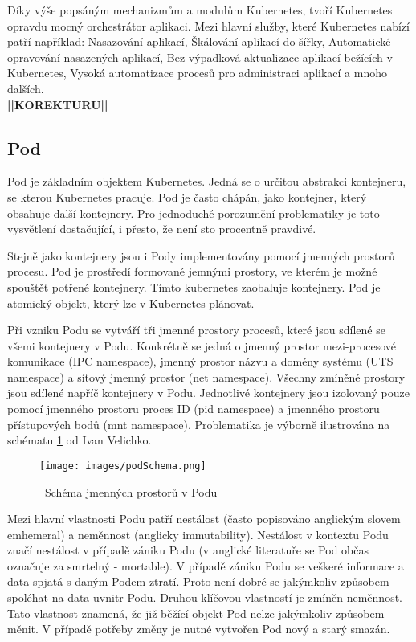 Díky výše popsáným mechanizmům a modulům Kubernetes, tvoří Kubernetes opravdu mocný orchestrátor aplikaci. Mezi hlavní služby, které Kubernetes nabízí patří například: Nasazování aplikací, Škálování aplikací do šířky, Automatické opravování nasazených aplikací, Bez výpadková aktualizace aplikací bežících v Kubernetes, Vysoká automatizace procesů pro administraci aplikací a mnoho dalších.\cite{poulton_2022_the}\\
\textbf{||KOREKTURU||}
\subsection{Pod}
Pod je základním objektem Kubernetes. Jedná se o určitou abstrakci kontejneru, se kterou Kubernetes pracuje. Pod je často chápán, jako kontejner, který obsahuje další kontejnery. Pro jednoduché porozumění problematiky je toto vysvětlení dostačující, i přesto, že není sto procentně pravdivé.

Stejně jako kontejnery jsou i Pody implementovány pomocí jmenných prostorů procesu. Pod je prostředí formované jemnými prostory, ve kterém je možné spouštět potřené kontejnery. Tímto kubernetes zaobaluje kontejnery. Pod je atomický objekt, který lze v Kubernetes plánovat.

Při vzniku Podu se vytváří tři jmenné prostory procesů, které jsou sdílené se všemi kontejnery v Podu. Konkrétně se jedná o jmenný prostor mezi-procesové komunikace (IPC namespace), jmenný prostor názvu a domény systému (UTS namespace) a síťový jmenný prostor (net namespace). Všechny zmíněné prostory jsou sdílené napříč kontejnery v Podu. Jednotlivé kontejnery jsou izolovaný pouze pomocí jmenného prostoru proces ID (pid namespace)
a jmenného prostoru přístupových bodů (mnt namespace). Problematika je výborně ilustrována na schématu \ref{img:podSchema} od Ivan Velichko.
\begin{figure}[ht]
\centering
\texttt{[image: images/podSchema.png]}
\caption{~Schéma jmenných prostorů v Podu\cite{velichko_2021_kubernetes}}\label{img:podSchema}
\end{figure}

Mezi hlavní vlastnosti Podu patří nestálost (často popisováno anglickým slovem emhemeral) a neměnnost (anglicky immutability). Nestálost v kontextu Podu značí nestálost v případě zániku Podu (v anglické literatuře se Pod občas označuje za smrtelný - mortable). V případě zániku Podu se veškeré informace a data spjatá s daným Podem ztratí. Proto není dobré se jakýmkoliv způsobem spoléhat na data uvnitr Podu. Druhou klíčovou vlastností je zmíněn neměnnost. Tato vlastnost znamená, že již běžící objekt Pod nelze jakýmkoliv způsobem měnit. V případě potřeby změny je nutné vytvořen Pod nový a starý smazán.\cite{poulton_2022_the}

